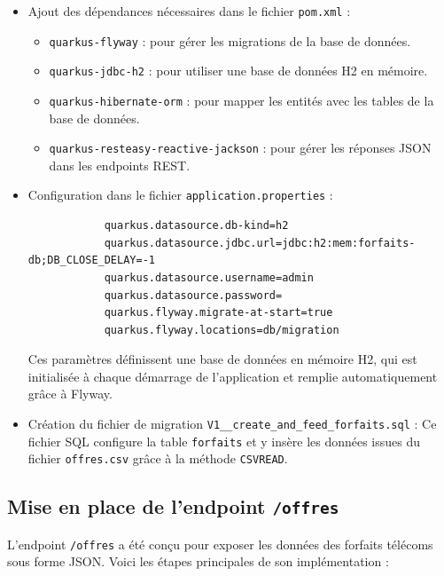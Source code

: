 \documentclass{article}
\begin{document}
	\begin{itemize}
		\item Ajout des dépendances nécessaires dans le fichier \texttt{pom.xml} :
		\begin{itemize}
			\item \texttt{quarkus-flyway} : pour gérer les migrations de la base de données.
			\item \texttt{quarkus-jdbc-h2} : pour utiliser une base de données H2 en mémoire.
			\item \texttt{quarkus-hibernate-orm} : pour mapper les entités avec les tables de la base de données.
			\item \texttt{quarkus-resteasy-reactive-jackson} : pour gérer les réponses JSON dans les endpoints REST.
		\end{itemize}
		
		\item Configuration dans le fichier \texttt{application.properties} :
		\begin{verbatim}
			quarkus.datasource.db-kind=h2
			quarkus.datasource.jdbc.url=jdbc:h2:mem:forfaits-db;DB_CLOSE_DELAY=-1
			quarkus.datasource.username=admin
			quarkus.datasource.password=
			quarkus.flyway.migrate-at-start=true
			quarkus.flyway.locations=db/migration
		\end{verbatim}
		
		Ces paramètres définissent une base de données en mémoire H2, qui est initialisée à chaque démarrage de l'application et remplie  automatiquement grâce à Flyway.
		
		\item Création du fichier de migration \texttt{V1\_\_create\_and\_feed\_forfaits.sql} :
		Ce fichier SQL configure la table \texttt{forfaits} et y insère les données issues du fichier \texttt{offres.csv} grâce à la méthode \texttt{CSVREAD}.
	\end{itemize}
	
	\subsection{Mise en place de l'endpoint \texttt{/offres}}
	
	L'endpoint \texttt{/offres} a été conçu pour exposer les données des forfaits télécoms sous forme JSON. Voici les étapes principales de son implémentation :
\end{document}
